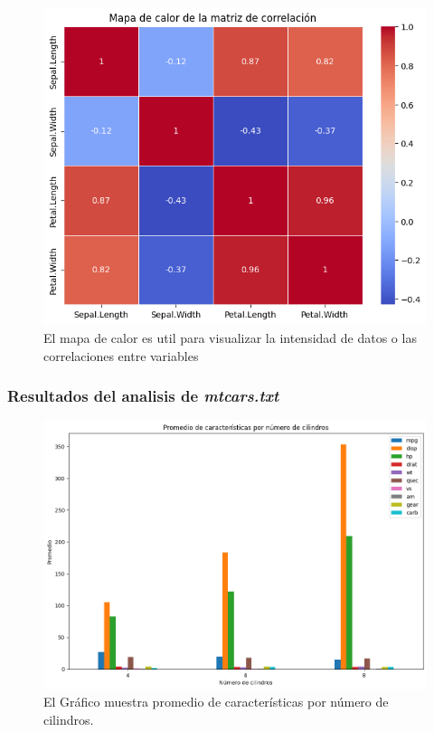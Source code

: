 \documentclass[conference]{IEEEtran}
\begin{document}
            \begin{figure}[h]
                \centering
                \includegraphics[width=0.79\linewidth]{IrisGraf2.png}
                \caption{El mapa de calor es util para visualizar la intensidad de datos o las correlaciones entre variables}
            \end{figure}
            \hfill
        \subsubsection{Resultados del analisis de \textit{mtcars.txt}}
            \hfill
            \begin{figure}[h]
                \centering
                \includegraphics[width=0.95\linewidth]{mtcarsGraf1.png}
                \caption{El Gráfico muestra promedio de características por número de cilindros.}
            \end{figure}
    
\end{document}
